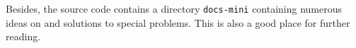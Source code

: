 Besides, the source code contains a directory \texttt{docs-mini} containing numerous
ideas on and solutions to special problems. This is also a good place for further
reading.


